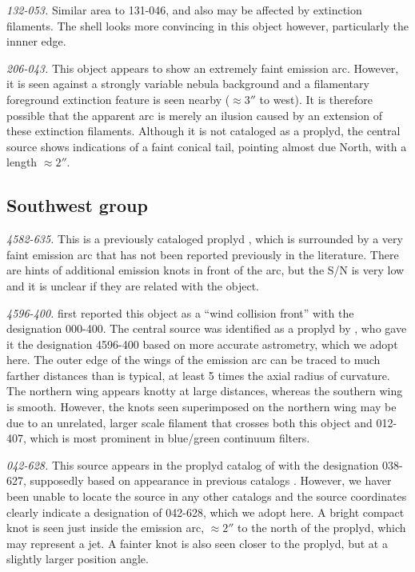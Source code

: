 \documentclass[iop, apj]{emulateapj}
\begin{document}
\textit{132-053.}  Similar area to 131-046, and also may be affected
by extinction filaments.  The shell looks more convincing in this
object however, particularly the innner edge.


\textit{206-043.} This object appears to show an extremely faint
emission arc.  However, it is seen against a strongly variable nebula
background and a filamentary foreground extinction feature is seen
nearby (\(\approx 3''\) to west).  It is therefore possible that
the apparent arc is merely an ilusion caused by an extension of these
extinction filaments.  Although it is not cataloged as a proplyd, the
central source shows indications of a faint conical tail, pointing
almost due North, with a length \(\approx 2''\). 

\subsection{Southwest group}
\label{sec:sw-group}

\textit{4582-635.} This is a previously cataloged proplyd
\citep{Ricci:2008a}, which is surrounded by a very faint emission arc
that has not been reported previously in the literature. There are
hints of additional emission knots in front of the arc, but the S/N is
very low and it is unclear if they are related with the object.

\textit{4596-400.} \citet{Bally:2000a} first reported this object as a
``wind collision front'' with the designation 000-400. The central
source was identified as a proplyd by \citet{Ricci:2008a}, who gave it
the designation 4596-400 based on more accurate astrometry, which we
adopt here. The outer edge of the wings of the emission arc can be
traced to much farther distances than is typical, at least 5 times the
axial radius of curvature. The northern wing appears knotty at large
distances, whereas the southern wing is smooth. However, the knots
seen superimposed on the northern wing may be due to an unrelated,
larger scale filament that crosses both this object and 012-407, which
is most prominent in blue/green continuum filters.

\textit{042-628.} This source appears in the proplyd catalog of
\citet{Ricci:2008a} with the designation 038-627, supposedly based on
appearance in previous catalogs \citep{ODell:1996a}. However, we haver
been unable to locate the source in any other catalogs and the source
coordinates clearly indicate a designation of 042-628, which we adopt
here.  A bright compact knot is seen just inside the emission arc,
\(\approx 2''\) to the north of the proplyd, which may represent a
jet.  A fainter knot is also seen closer to the proplyd, but at a
slightly larger position angle.
\end{document}

